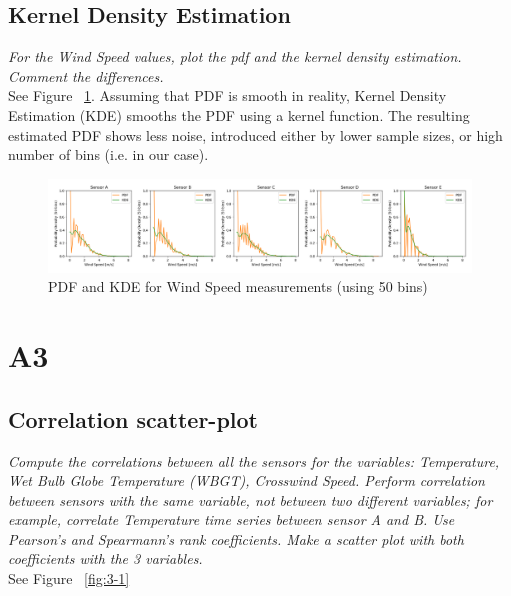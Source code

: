 \documentclass{article}
\begin{document}
\newpage

\subsection{Kernel Density Estimation}
\textit{
For the Wind Speed values, plot the pdf and the kernel density estimation. Comment the differences.
}\\

See Figure ~\ref{fig:2-2}. Assuming that PDF is smooth in reality, Kernel Density Estimation (KDE) smooths the PDF using a kernel function.
The resulting estimated PDF shows less noise, introduced either by lower sample sizes, or high number of bins (i.e. in our case).

\begin{figure}[!htb]
\centering
\includegraphics[width=\textwidth]{2-2-kde.png}
\caption{PDF and KDE for Wind Speed measurements (using 50 bins)}
\label{fig:2-2}
\end{figure}


\newpage

\section{A3}

\subsection{Correlation scatter-plot}
\textit{
Compute the correlations between all the sensors for the variables: Temperature, Wet Bulb Globe Temperature (WBGT), Crosswind Speed. Perform correlation between sensors with the same variable, not between two different variables; for example, correlate Temperature time series between sensor A and B. Use Pearson’s and Spearmann’s rank coefficients. Make a scatter plot with both coefficients with the 3 variables.
}\\


See Figure ~\ref{fig:3-1}
\end{document}
